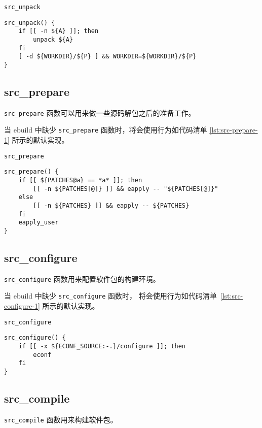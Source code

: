 \begin{listing}[H]
\caption{\texttt{src_unpack}} \label{lst:src-unpack-1}
\begin{verbatim}
src_unpack() {
    if [[ -n ${A} ]]; then
        unpack ${A}
    fi
    [ -d ${WORKDIR}/${P} ] && WORKDIR=${WORKDIR}/${P}
}
\end{verbatim}
\end{listing}

\subsection{src_prepare}

\texttt{src_prepare} 函数可以用来做一些源码解包之后的准备工作。

当 ebuild 中缺少 \texttt{src_prepare} 函数时，将会使用行为如代码清单
\ref{lst:src-prepare-1} 所示的默认实现。

\begin{listing}[H]
\caption{\texttt{src_prepare}} \label{lst:src-prepare-1}
\begin{verbatim}
src_prepare() {
    if [[ ${PATCHES@a} == *a* ]]; then
        [[ -n ${PATCHES[@]} ]] && eapply -- "${PATCHES[@]}"
    else
        [[ -n ${PATCHES} ]] && eapply -- ${PATCHES}
    fi
    eapply_user
}
\end{verbatim}
\end{listing}

\subsection{src_configure}

\texttt{src_configure} 函数用来配置软件包的构建环境。

当 ebuild 中缺少 \texttt{src_configure} 函数时，
将会使用行为如代码清单~\ref{lst:src-configure-1} 所示的默认实现。

\begin{listing}[H]
\caption{\texttt{src_configure}} \label{lst:src-configure-1}
\begin{verbatim}
src_configure() {
    if [[ -x ${ECONF_SOURCE:-.}/configure ]]; then
        econf
    fi
}
\end{verbatim}
\end{listing}

\subsection{src_compile}

\texttt{src_compile} 函数用来构建软件包。

